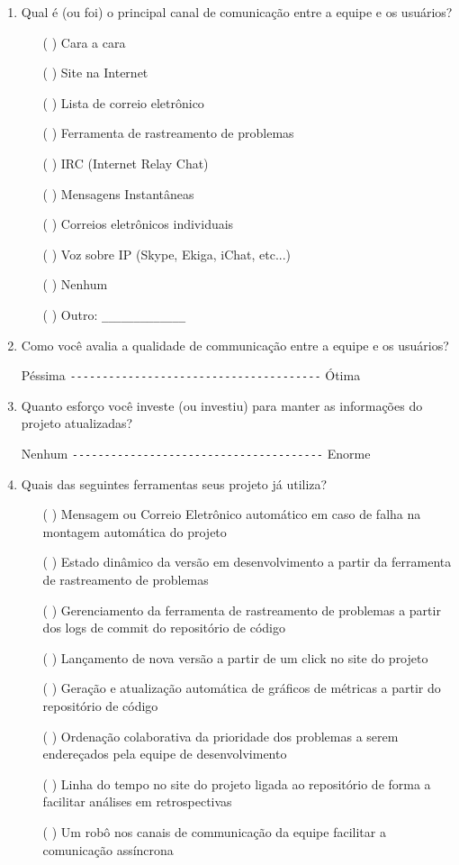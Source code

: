 \begin{enumerate}
\item Qual é (ou foi) o principal canal de comunicação entre a equipe
  e os usuários?
  \begin{itemize}
  \item[( )] Cara a cara
  \item[( )] Site na Internet
  \item[( )] Lista de correio eletrônico
  \item[( )] Ferramenta de rastreamento de problemas
  \item[( )] IRC (Internet Relay Chat)
  \item[( )] Mensagens Instantâneas
  \item[( )] Correios eletrônicos individuais
  \item[( )] Voz sobre IP (Skype, Ekiga, iChat, etc...)
  \item[( )] Nenhum
  \item[( )] Outro: \verb=_____________=
  \end{itemize}

\item Como você avalia a qualidade de communicação entre a equipe e os
  usuários?

  Péssima \verb=---------------------------------------= Ótima

\item Quanto esforço você investe (ou investiu) para manter as
  informações do projeto atualizadas?

  Nenhum \verb=---------------------------------------= Enorme

\item Quais das seguintes ferramentas seus projeto já utiliza?
  \begin{itemize}
  \item[( )] Mensagem ou Correio Eletrônico automático em caso de
    falha na montagem automática do projeto
  \item[( )] Estado dinâmico da versão em desenvolvimento a partir da
    ferramenta de rastreamento de problemas
  \item[( )] Gerenciamento da ferramenta de rastreamento de problemas a
    partir dos logs de commit do repositório de código
  \item[( )] Lançamento de nova versão a partir de um click no site do
    projeto
  \item[( )] Geração e atualização automática de gráficos de métricas
    a partir do repositório de código
  \item[( )] Ordenação colaborativa da prioridade dos problemas a
    serem endereçados pela equipe de desenvolvimento
  \item[( )] Linha do tempo no site do projeto ligada ao repositório
    de forma a facilitar análises em retrospectivas
  \item[( )] Um robô nos canais de communicação da equipe facilitar a
    comunicação assíncrona
  \end{itemize}


\end{enumerate}
